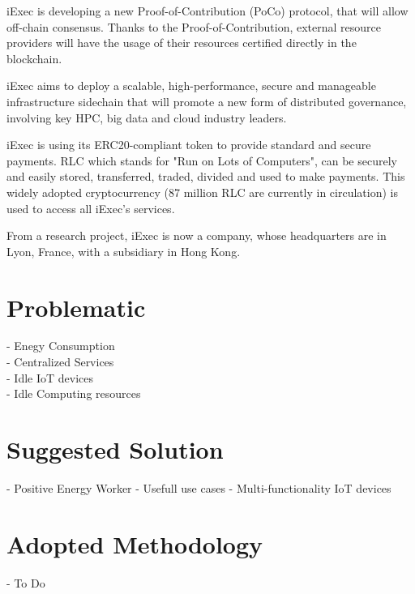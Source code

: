 iExec is developing a new Proof-of-Contribution (PoCo) protocol, that will allow off-chain consensus.
Thanks to the Proof-of-Contribution, external resource providers will have the usage of their
resources certified directly in the blockchain.

iExec aims to deploy a scalable, high-performance, secure and manageable infrastructure sidechain
that will promote a new form of distributed governance, involving key HPC, big data and cloud industry
leaders.

iExec is using its ERC20-compliant token to provide standard and secure payments. RLC which stands for
"Run on Lots of Computers", can be securely and easily stored, transferred, traded, divided and used
to make payments. This widely adopted cryptocurrency (87 million RLC are currently in circulation)
is used to access all iExec's services.

From a research project, iExec is now a company, whose headquarters are in Lyon, France, with a
subsidiary in Hong Kong.

\section{Problematic}
- Enegy Consumption \\
- Centralized Services \\
- Idle IoT devices \\
- Idle Computing resources 

\section{Suggested Solution}
- Positive Energy Worker
- Usefull use cases
- Multi-functionality IoT devices

\section{Adopted Methodology}
- To Do

\clearpage